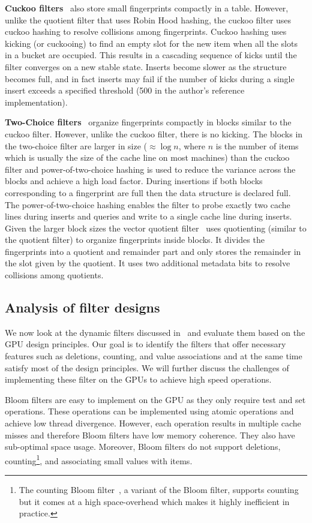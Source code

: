 \textbf{Cuckoo filters}~\cite{FanAnKa14,BreslowJ18} also store small
fingerprints compactly in a table. However, unlike the quotient filter that uses
Robin Hood hashing, the cuckoo filter uses cuckoo hashing to resolve collisions
among fingerprints. Cuckoo hashing uses kicking (or cuckooing) to find an empty
slot for the new item when all the slots in a bucket are occupied. This results
in a cascading sequence of kicks until the filter converges on a new stable
state. Inserts become slower as the structure becomes full, and in fact inserts
may fail if the number of kicks during a single insert exceeds a specified
threshold (500 in the author's reference implementation).

\textbf{Two-Choice filters}~\cite{pandeySigmod21} organize fingerprints
compactly in blocks similar to the cuckoo filter. However, unlike the cuckoo
filter, there is no kicking. The blocks in the two-choice filter are larger in
size ($\approx \log{n}$, where $n$ is the number of items which is usually the
size of the cache line on most machines) than the cuckoo filter and
power-of-two-choice hashing is used to reduce the variance across the blocks and
achieve a high load factor. During insertions if both blocks corresponding to a
fingerprint are full then the data structure is declared full. The
power-of-two-choice hashing enables the filter to probe exactly two cache lines
during inserts and queries and write to a single cache line during inserts.
Given the larger block sizes the vector quotient filter~\cite{pandeySigmod21}
uses quotienting (similar to the quotient filter) to organize fingerprints
inside blocks. It divides the fingerprints into a quotient and remainder part
and only stores the remainder in the slot given by the quotient. It uses two
additional metadata bits to resolve collisions among quotients.


\subsection{Analysis of filter designs}

We now look at the dynamic filters discussed in~ and evaluate
them based on the GPU design principles.  Our goal is to identify the filters
that offer necessary features such as deletions, counting, and value
associations and at the same time satisfy most of the design principles.  We
will further discuss the challenges of implementing these filter on the GPUs to
achieve high speed operations.

Bloom filters are easy to implement on the GPU as they only require test and set
operations. These operations can be implemented using atomic operations and
achieve low thread divergence. However, each operation results in multiple cache
misses and therefore Bloom filters have low memory coherence. They also have
sub-optimal space usage. Moreover, Bloom filters do not support deletions,
counting\footnote{The counting Bloom filter~\cite{FanCaAl00}, a variant of the
Bloom filter, supports counting but it comes at a high space-overhead which
makes it highly inefficient in practice.}, and associating small values with
items.

